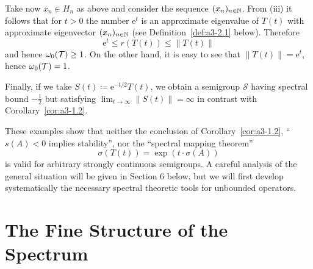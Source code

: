 Take now $x_{n} \in H_{n}$ as above and consider the sequence $(x_{n})_{n \in \mathbb{N}}$.
From (iii) it follows that for $t > 0$ the number $\mathrm{e}^{t}$ is an approximate eigenvalue of $T(t)$ with approximate eigenvector $(x_{n})_{n \in \mathbb{N}}$ (see Definition~\ref{def:a3-2.1} below).
Therefore 
%
\[
	 \mathrm{e}^{t} \leq r(T(t)) \leq \|T(t)\|
\]
%
and hence $\omega_{0}(\mathcal{T}) \geq 1$.
On the other hand, it is easy to see that $\|T(t)\| = \mathrm{e}^{t}$, hence $\omega_{0}(\mathcal{T}) = 1$.


Finally, if we take $S(t) \coloneqq \mathrm{e}^{-t/2}T(t)$, we obtain a semigroup $\mathcal{S}$ 
having spectral bound $-\frac{1}{2}$ but satisfying $\lim_{t \to \infty} \|S(t)\| = \infty$ in contrast with Corollary~\ref{cor:a3-1.2}.

These examples show that neither the conclusion of Corollary~\ref{cor:a3-1.2}, \ie \enquote{$s(A) < 0$ implies stability}, nor the \enquote{spectral mapping theorem}
\[
    \sigma(T(t)) = \exp(t\cdot\sigma(A))
\]
is valid for arbitrary strongly continuous semigroups.
A careful analysis of the general situation will be given in Section 6 below, but we will first develop systematically the necessary spectral theoretic tools for unbounded operators.
\section{The Fine Structure of the Spectrum}\label{sec:a3-2}

